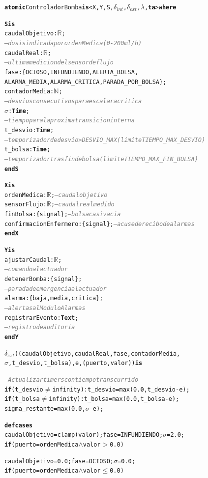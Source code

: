 \documentclass[12pt, a4paper]{article}
\newcommand{\cmlgt}{$>$}
\newcommand{\cmlle}{$\leq$}
\newcommand{\cmlN}{$\mathbb{N}$}
\newcommand{\cmlwedge}{$\wedge$}
\newcommand{\cmlneq}{$\neq$}
\newcommand{\kw}[1]{\textbf{#1}}
\newcommand{\cmlR}{$\mathbb{R}$}
\newcommand{\cmlTime}{\textbf{Time}}
\newcommand{\cmlsigma}{$\sigma$}
\newcommand{\dint}{$\delta_{\mathit{int}}$}
\newcommand{\dext}{$\delta_{\mathit{ext}}$}
\newcommand{\clambda}{$\lambda$}
\newcommand{\cmlta}{\textbf{ta}}
\newcommand{\cmlcomment}[1]{\textit{\textcolor{gray}{#1}}}
\newenvironment{cmldevs}{%
  \begin{alltt}\small%
}{%
  \end{alltt}%
}
\begin{document}
\begin{center}
\begin{cmldevs}
\kw{atomic} ControladorBomba \kw{is} <X, Y, S, \dint{}, \dext{}, \clambda{}, \cmlta{}> \kw{where}

\kw{S is}
    caudalObjetivo : \cmlR{};
        \cmlcomment{-- dosis indicada por ordenMedica (0-200 ml/h)}
    caudalReal     : \cmlR{};
        \cmlcomment{-- ultima medicion del sensor de flujo}
    fase : \{OCIOSO, INFUNDIENDO, ALERTA\_BOLSA,
             ALARMA\_MEDIA, ALARMA\_CRITICA, PARADA\_POR\_BOLSA\};
    contadorMedia  : \cmlN{};
        \cmlcomment{-- desvios consecutivos para escalar a critica}
    \cmlsigma{}    : \cmlTime{};
        \cmlcomment{-- tiempo para la proxima transicion interna}
    t\_desvio      : \cmlTime{};
        \cmlcomment{-- temporizador de desvio >DESVIO\_MAX (limite TIEMPO\_MAX\_DESVIO)}
    t\_bolsa       : \cmlTime{};
        \cmlcomment{-- temporizador tras fin de bolsa (limite TIEMPO\_MAX\_FIN\_BOLSA)}
\kw{end S}

\kw{X is}
    ordenMedica           : \cmlR{};      \cmlcomment{-- caudal objetivo}
    sensorFlujo           : \cmlR{};      \cmlcomment{-- caudal real medido}
    finBolsa              : \{signal\};   \cmlcomment{-- bolsa casi vacia}
    confirmacionEnfermero : \{signal\};   \cmlcomment{-- acuse de recibo de alarmas}
\kw{end X}

\kw{Y is}
    ajustarCaudal   : \cmlR{};
        \cmlcomment{-- comando al actuador}
    detenerBomba    : \{signal\};
        \cmlcomment{-- parada de emergencia al actuador}
    alarma          : \{baja, media, critica\};
        \cmlcomment{-- alertas al ModuloAlarmas}
    registrarEvento : \kw{Text};
        \cmlcomment{-- registro de auditoria}
\kw{end Y}

\dext{}((caudalObjetivo, caudalReal, fase, contadorMedia,
         \cmlsigma{}, t\_desvio, t\_bolsa), e, (puerto, valor)) \kw{is}

    \cmlcomment{-- Actualizar timers con tiempo transcurrido}
    \kw{if} (t\_desvio \cmlneq{} infinity): t\_desvio = max(0.0, t\_desvio - e);
    \kw{if} (t\_bolsa  \cmlneq{} infinity): t\_bolsa  = max(0.0, t\_bolsa  - e);
    sigma\_restante = max(0.0, \cmlsigma{} - e);

    \kw{defcases}
        caudalObjetivo = clamp(valor); fase = INFUNDIENDO; \cmlsigma{} = 2.0;
            \kw{if} (puerto = ordenMedica \cmlwedge{} valor \cmlgt{} 0.0)

        caudalObjetivo = 0.0; fase = OCIOSO; \cmlsigma{} = 0.0;
            \kw{if} (puerto = ordenMedica \cmlwedge{} valor \cmlle{} 0.0)


\end{cmldevs}
\end{center}
\end{document}
